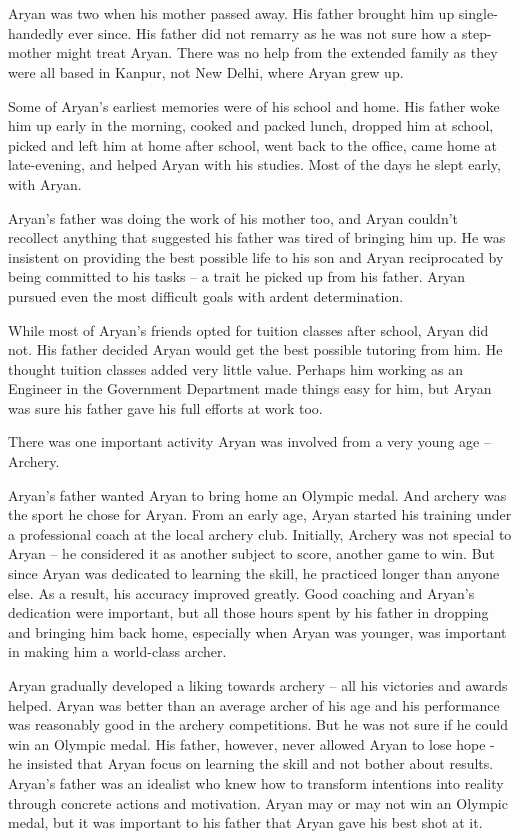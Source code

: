 \chapter{}

Aryan was two when his mother passed away. His father brought him up
single-handedly ever since. His father did not remarry as he was not sure how a
step-mother might treat Aryan. There was no help from the extended family as
they were all based in Kanpur, not New Delhi, where Aryan grew up.

Some of Aryan's earliest memories were of his school and home. His father woke
him up early in the morning, cooked and packed lunch, dropped him at school,
picked and left him at home after school, went back to the office, came home at
late-evening, and helped Aryan with his studies. Most of the days he slept
early, with Aryan.

Aryan's father was doing the work of his mother too, and Aryan couldn't
recollect anything that suggested his father was tired of bringing him up. He
was insistent on providing the best possible life to his son and Aryan
reciprocated by being committed to his tasks – a trait he picked up from his
father. Aryan pursued even the most difficult goals with ardent determination.

While most of Aryan's friends opted for tuition classes after school, Aryan did
not. His father decided Aryan would get the best possible tutoring from him. He
thought tuition classes added very little value. Perhaps him working as an
Engineer in the Government Department made things easy for him, but Aryan was
sure his father gave his full efforts at work too.

There was one important activity Aryan was involved from a very young age –
Archery.

Aryan's father wanted Aryan to bring home an Olympic medal. And archery was the
sport he chose for Aryan. From an early age, Aryan started his training under a
professional coach at the local archery club. Initially, Archery was not special
to Aryan – he considered it as another subject to score, another game to win.
But since Aryan was dedicated to learning the skill, he practiced longer than
anyone else. As a result, his accuracy improved greatly. Good coaching and
Aryan's dedication were important, but all those hours spent by his father in
dropping and bringing him back home, especially when Aryan was younger, was
important in making him a world-class archer.

Aryan gradually developed a liking towards archery – all his victories and
awards helped. Aryan was better than an average archer of his age and his
performance was reasonably good in the archery competitions. But he was not sure
if he could win an Olympic medal. His father, however, never allowed Aryan to
lose hope - he insisted that Aryan focus on learning the skill and not bother
about results. Aryan's father was an idealist who knew how to transform
intentions into reality through concrete actions and motivation. Aryan may or may
not win an Olympic medal, but it was important to his father that Aryan gave his
best shot at it.


